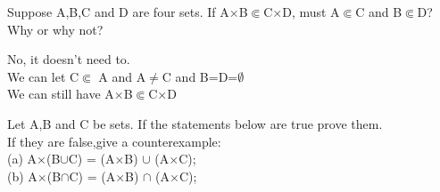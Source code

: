 \documentclass[11pt, a4paper, UTF8]{ctexart}
\begin{document}
\begin{problem}[UD:9.13]
Suppose A,B,C and D are four sets. If A$\times$B$\Subset$C$\times$D, must A$\Subset$C and B$\Subset$D? Why or why not?
\end{problem}

\begin{solution}
No, it doesn't need to.\\
We can let C$\Subset$ A and A$\not=$C and B=D=$\emptyset$\\
We can still have A$\times$B$\Subset$C$\times$D\\

\end{solution}






\begin{problem}[UD:9.14]
Let A,B and C be sets. If the statements below are true prove them.\\
If they are false,give a counterexample:\\
(a) A$\times$(B$\cup$C) = (A$\times$B) $\cup$ (A$\times$C);\\
(b) A$\times$(B$\cap$C) = (A$\times$B) $\cap$ (A$\times$C);\\
\end{problem}
\end{document}
